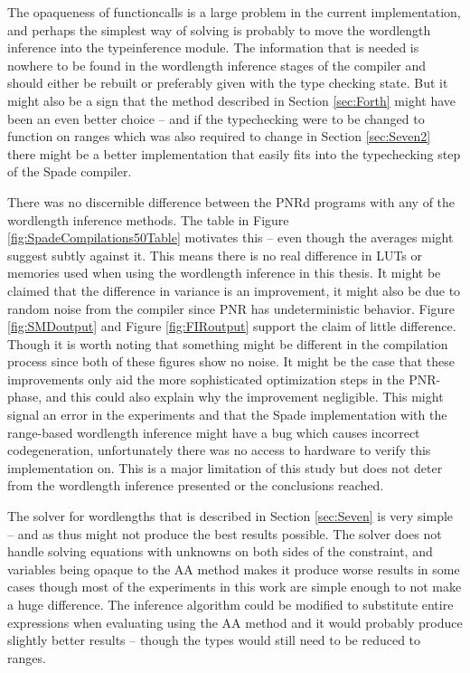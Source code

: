 The opaqueness of functioncalls is a large problem in the current implementation, and perhaps the simplest way of solving is probably to move the wordlength inference into the typeinference module. The information that is needed is nowhere to be found in the wordlength inference stages of the compiler and should either be rebuilt or preferably given with the type checking state. But it might also be a sign that the method described in Section \ref{sec:Forth} might have been an even better choice -- and if the typechecking were to be changed to function on ranges which was also required to change in Section \ref{sec:Seven2} there might be a better implementation that easily fits into the typechecking step of the Spade compiler.

There was no discernible difference between the PNRd programs with any of the wordlength inference methods. The table in Figure \ref{fig:SpadeCompilations50Table} motivates this -- even though the averages might suggest subtly against it. This means there is no real difference in LUTs or memories used when using the wordlength inference in this thesis. It might be claimed that the difference in variance is an improvement, it might also be due to random noise from the compiler since PNR has undeterministic behavior. Figure \ref{fig:SMDoutput} and Figure \ref{fig:FIRoutput} support the claim of little difference. Though it is worth noting that something might be different in the compilation process since both of these figures show no noise. It might be the case that these improvements only aid the more sophisticated optimization steps in the PNR-phase, and this could also explain why the improvement negligible. This might signal an error in the experiments and that the Spade implementation with the range-based wordlength inference might have a bug which causes incorrect codegeneration, unfortunately there was no access to hardware to verify this implementation on. This is a major limitation of this study but does not deter from the wordlength inference presented or the conclusions reached.

The solver for wordlengths that is described in Section \ref{sec:Seven} is very simple -- and as thus might not produce the best results possible. The solver does not handle solving equations with unknowns on both sides of the constraint, and variables being opaque to the AA method makes it produce worse results in some cases though most of the experiments in this work are simple enough to not make a huge difference. The inference algorithm could be modified to substitute entire expressions when evaluating using the AA method and it would probably produce slightly better results -- though the types would still need to be reduced to ranges.

